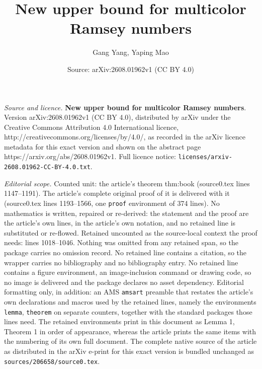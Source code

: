 \documentclass[10pt,a4paper]{amsart}
\title{\textbf{New upper bound for multicolor Ramsey numbers}}
\author{Gang Yang, Yaping Mao}
\date{Source: arXiv:2608.01962v1 (CC BY 4.0)}
\begin{document}
\maketitle

\noindent\emph{Source and licence.} \textbf{New upper bound for multicolor Ramsey numbers}. Version arXiv:2608.01962v1 (CC BY 4.0), distributed by arXiv under the Creative Commons Attribution 4.0 International licence, http://creativecommons.org/licenses/by/4.0/, as recorded in the arXiv licence metadata for this exact version and shown on the abstract page https://arxiv.org/abs/2608.01962v1. Full licence notice: \texttt{licenses/arxiv-2608.01962-CC-BY-4.0.txt}.\par\smallskip

\noindent\textit{Editorial scope.} Counted unit: the article's theorem thm:book (source0.tex lines 1147--1191). The article's complete original proof of it is delivered with it (source0.tex lines 1193--1566, one \texttt{proof} environment of 374 lines). No mathematics is written, repaired or re-derived: the statement and the proof are the article's own lines, in the article's own notation, and no retained line is substituted or re-flowed.  Retained uncounted as the source-local context the proof needs: lines 1018--1046.  Nothing was omitted from any retained span, so the package carries no omission record.  No retained line contains a citation, so the wrapper carries no bibliography and no bibliography entry.  No retained line contains a figure environment, an image-inclusion command or drawing code, so no image is delivered and the package declares no asset dependency.  Editorial formatting only, in addition: an AMS \texttt{amsart} preamble that restates the article's own declarations and macros used by the retained lines, namely the environments \texttt{lemma}, \texttt{theorem} on separate counters, together with the standard packages those lines need.  The retained environments print in this document as Lemma 1, Theorem 1 in order of appearance, whereas the article prints the same items with the numbering of its own full document.  The complete native source of the article as distributed in the arXiv e-print for this exact version is bundled unchanged as \texttt{sources/206658/source0.tex}.
\end{document}
